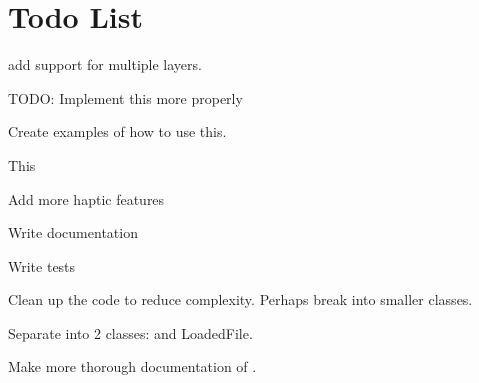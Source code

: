 \chapter{Todo List}
\hypertarget{todo}{}\label{todo}

\begin{DoxyRefList}
\item[Member \doxylink{class_atlas_1_1abstract_a7f6e5dc79241315ff8753e3ea3fbf3d2}{Atlas\+::abstract\texorpdfstring{$<$}{<} Console\+Sink \texorpdfstring{$>$}{>}\+::depth} ]\label{todo__todo000008}%
%
add support for multiple layers.  
\item[Member \doxylink{namespace_atlas_afa2a252b78c0821fed0a608c60cfd2f0}{Atlas\+::Default\+Physics\+Trace} (const char \texorpdfstring{$\ast$}{*}in\+FMT,...)]\label{todo__todo000009}%
%
TODO\+: Implement this more properly  
\item[Class \doxylink{class_atlas_1_1_input_registry}{Atlas\+::Input\+Registry} ]\label{todo__todo000006}%
%
Create examples of how to use this.  
\item[Class \doxylink{class_atlas_1_1_localization_registry}{Atlas\+::Localization\+Registry} ]\label{todo__todo000007}%
%
This  
\item[File \doxylink{_common_8h}{Common.h} ]\label{todo__todo000001}%
%
Add more haptic features 
\item[File \doxylink{_file_system_registry_8h}{File\+System\+Registry.h} ]\label{todo__todo000005}%
%
Write documentation 



Write tests 



Clean up the code to reduce complexity. Perhaps break into smaller classes.  
\item[File \doxylink{_registered_file_8h}{Registered\+File.h} ]\label{todo__todo000004}%
%
Separate  into 2 classes\+:  and Loaded\+File. 



Make more thorough documentation of . 
\end{DoxyRefList}